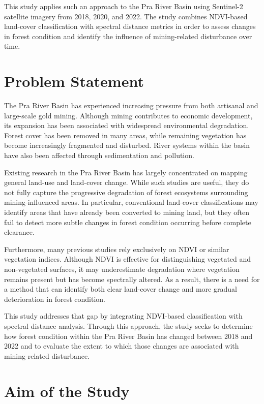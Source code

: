 \documentclass[a4paper,12pt]{report}
\begin{document}
This study applies such an approach to the Pra River Basin using Sentinel-2 satellite imagery from 2018, 2020, and 2022. The study combines NDVI-based land-cover classification with spectral distance metrics in order to assess changes in forest condition and identify the influence of mining-related disturbance over time.


\section{Problem Statement}

The Pra River Basin has experienced increasing pressure from both artisanal and large-scale gold mining. Although mining contributes to economic development, its expansion has been associated with widespread environmental degradation. Forest cover has been removed in many areas, while remaining vegetation has become increasingly fragmented and disturbed. River systems within the basin have also been affected through sedimentation and pollution.

Existing research in the Pra River Basin has largely concentrated on mapping general land-use and land-cover change. While such studies are useful, they do not fully capture the progressive degradation of forest ecosystems surrounding mining-influenced areas. In particular, conventional land-cover classifications may identify areas that have already been converted to mining land, but they often fail to detect more subtle changes in forest condition occurring before complete clearance.

Furthermore, many previous studies rely exclusively on NDVI or similar vegetation indices. Although NDVI is effective for distinguishing vegetated and non-vegetated surfaces, it may underestimate degradation where vegetation remains present but has become spectrally altered. As a result, there is a need for a method that can identify both clear land-cover change and more gradual deterioration in forest condition.

This study addresses that gap by integrating NDVI-based classification with spectral distance analysis. Through this approach, the study seeks to determine how forest condition within the Pra River Basin has changed between 2018 and 2022 and to evaluate the extent to which those changes are associated with mining-related disturbance.

\section{Aim of the Study}
\end{document}
